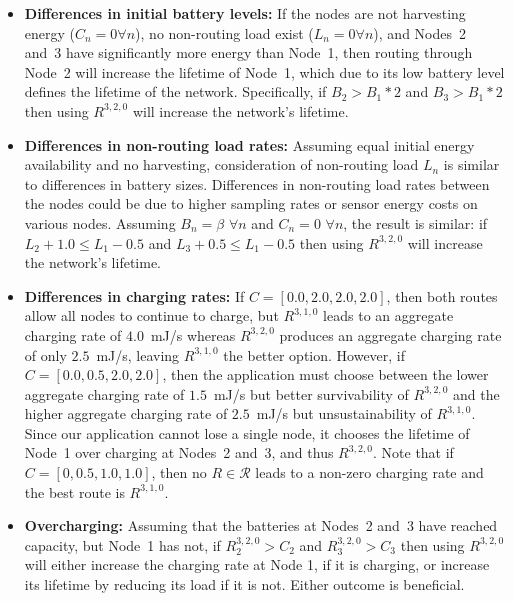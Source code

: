 \begin{itemize}

\item \textbf{Differences in initial battery levels:} If the nodes are not
harvesting energy ($C_n = 0 \forall n$), no non-routing load exist ($L_n = 0
\forall n$), and Nodes~2 and~3 have significantly more energy than Node~1,
then routing through Node~2 will increase the lifetime of Node~1, which due
to its low battery level defines the lifetime of the network. Specifically,
if $B_2 > B_1 * 2$ and $B_3 > B_1 * 2$  then using $R^{3,2,0}$ will increase
the network's lifetime.

\item \textbf{Differences in non-routing load rates:} Assuming equal initial
energy availability and no harvesting, consideration of non-routing load
$L_n$ is similar to differences in battery sizes. Differences in non-routing
load rates between the nodes could be due to higher sampling rates or sensor
energy costs on various nodes. Assuming $B_n = \beta$ $\forall n$ and $C_n =
0$ $\forall n$, the result is similar: if $L_2 + 1.0 \le L_1 - 0.5$ and $L_3
+ 0.5 \le L_1 - 0.5$ then using $R^{3,2,0}$ will increase the network's
lifetime.

\item \textbf{Differences in charging rates:} If $C = [0.0, 2.0, 2.0, 2.0]$,
then both routes allow all nodes to continue to charge, but $R^{3,1,0}$ leads
to an aggregate charging rate of $4.0$~mJ/s whereas $R^{3,2,0}$ produces an
aggregate charging rate of only $2.5$~mJ/s, leaving $R^{3,1,0}$ the better
option. However, if $C = [0.0, 0.5, 2.0, 2.0]$, then the application must
choose between the lower aggregate charging rate of $1.5$~mJ/s but better
survivability of $R^{3,2,0}$ and the higher aggregate charging rate of
$2.5$~mJ/s but unsustainability of $R^{3,1,0}$. Since our application cannot
lose a single node, it chooses the lifetime of Node~1 over charging at
Nodes~2 and~3, and thus $R^{3,2,0}$. Note that if $C = [0, 0.5, 1.0, 1.0]$,
then no $R \in \mathcal{R}$ leads to a non-zero charging rate and the best
route is $R^{3,1,0}$.

\vfill\eject

\item \textbf{Overcharging:} Assuming that the batteries at Nodes~2 and~3
have reached capacity, but Node~1 has not, if $R^{3,2,0}_2 > C_2$ and
$R^{3,2,0}_3 > C_3$ then using $R^{3,2,0}$ will either increase the charging
rate at Node 1, if it is charging, or increase its lifetime by reducing its
load if it is not. Either outcome is beneficial.

\end{itemize}

